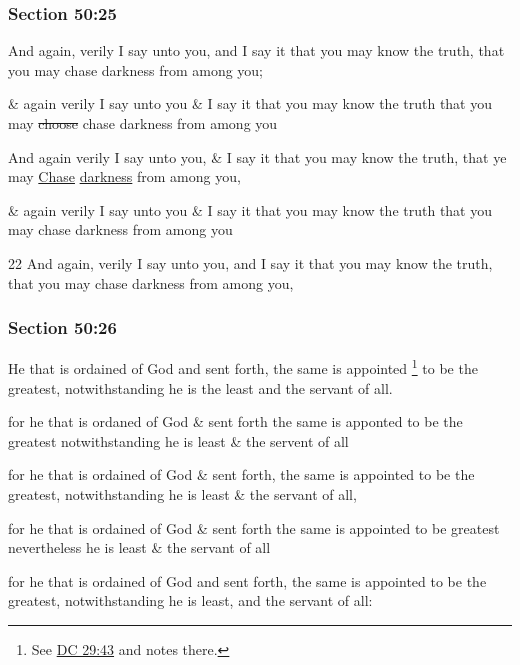 	\subsubsection{Section 50:25} %
		\label{DC50-25}

		And again, verily I say unto you, and I say it that you may know the truth, that you may chase darkness from among you;

		\begin{framed}
		\scriptsize
			\begin{compactdesc}
				\item[JSP] \& again verily I say unto you \& I say it that you may know the truth that you may \sout{choose} chase darkness from among you
				\item[Gilbert] And again verily I say unto you, \& I say it that you may know the truth, that ye may \uline{Chase} \uline{darkness} from among you,
				\item[Hyde and Smith] \& again verily I say unto you \& I say it that you may know the truth that you may chase darkness from among you
				\item[BC] 22 And again, verily I say unto you, and I say it that you may know the truth, that you may chase darkness from among you,
			\end{compactdesc}
		\end{framed}

	\subsubsection{Section 50:26} %
		\label{DC50-26}

		He that is ordained of God and sent forth, the same is appointed%
			\footnote{%
				See \hyperref[DC29-43]{DC 29:43} and notes there.
				}
		to be the greatest, notwithstanding he is the least and the servant of all.

		\begin{framed}
		\scriptsize
			\begin{compactdesc}
				\item[JSP] for he that is ordaned of God \& sent forth the same is apponted to be the greatest notwithstanding he is least \& the servent of all
				\item[Gilbert] for he that is ordained of God \& sent forth, the same is appointed to be the greatest, notwithstanding he is least \& the servant of all,
				\item[Hyde and Smith] for he that is ordained of God \& sent forth the same is appointed to be greatest nevertheless he is least \& the servant of all
				\item[BC] for he that is ordained of God and sent forth, the same is appointed to be the greatest, notwithstanding he is least, and the servant of all:
			\end{compactdesc}
		\end{framed}


